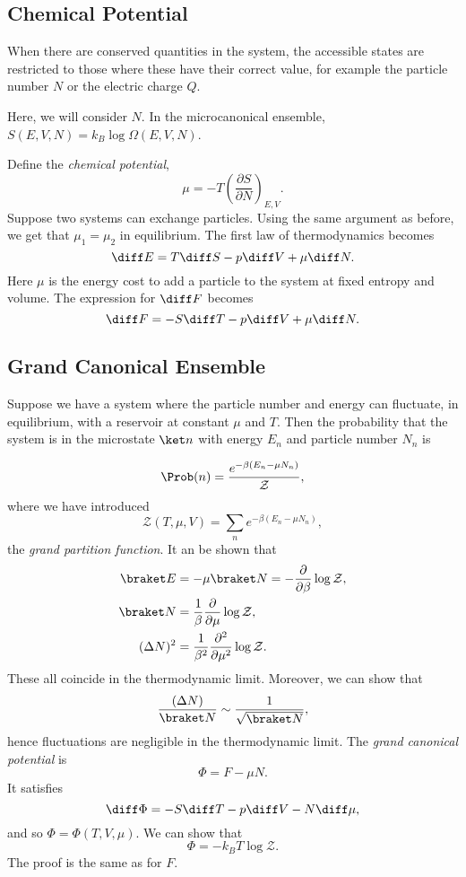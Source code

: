 \documentclass[12pt]{article}
\begin{document}
\subsection{Chemical Potential}
\label{sub:chem_pot}

When there are conserved quantities in the system, the accessible states are restricted to those where these have their correct value, for example the particle number $N$ or the electric charge $Q$.

Here, we will consider $N$. In the microcanonical ensemble, $S(E, V, N) = k_B \log \Omega(E, V, N)$.

Define the \emph{chemical potential},
\[
\mu = -T \left( \frac{\partial S}{\partial N} \right)_{E, V}.
\]
Suppose two systems can exchange particles. Using the same argument as before, we get that $\mu_1 = \mu_2$ in equilibrium. The first law of thermodynamics becomes
\[
\diff E = T \diff S - p \diff V + \mu \diff N.
\]
Here $\mu$ is the energy cost to add a particle to the system at fixed entropy and volume. The expression for $\diff F$ becomes
\[
\diff F = - S \diff T - p \diff V + \mu \diff N.
\]

\subsection{Grand Canonical Ensemble}
\label{sub:grand_can_ens}

Suppose we have a system where the particle number and energy can fluctuate, in equilibrium, with a reservoir at constant $\mu$ and $T$. Then the probability that the system is in the microstate $\ket n$ with energy $E_n$ and particle number $N_n$ is

\[
\Prob(n) = \frac{e^{-\beta(E_n - \mu N_n)}}{\mathcal{Z}},
\]
where we have introduced
\[
\mathcal{Z}(T, \mu , V) = \sum_n e^{-\beta(E_n - \mu N_n)},
\]
the \emph{grand partition function}. It an be shown that
\begin{align*}
	\braket E &= - \mu \braket N = - \frac{\partial}{\partial \beta} \log \mathcal{Z},\\
	\braket N &= \frac{1}{\beta} \frac{\partial}{\partial \mu} \log \mathcal{Z}, \\
	(\Delta N)^2 &= \frac{1}{\beta^2} \frac{\partial^2}{\partial \mu^2} \log \mathcal{Z}.
\end{align*}
These all coincide in the thermodynamic limit. Moreover, we can show that
\[
	\frac{(\Delta N)}{\braket N} \sim \frac{1}{\sqrt{\braket N}},
\]
hence fluctuations are negligible in the thermodynamic limit. The \emph{grand canonical potential} is
\[
\Phi = F - \mu N.
\]
It satisfies
\[
\diff \Phi = - S \diff T - p \diff V - N \diff \mu,
\]
and so $\Phi = \Phi(T, V, \mu)$. We can show that
\[
\Phi = - k_B T \log \mathcal{Z}.
\]
The proof is the same as for $F$.
\end{document}
